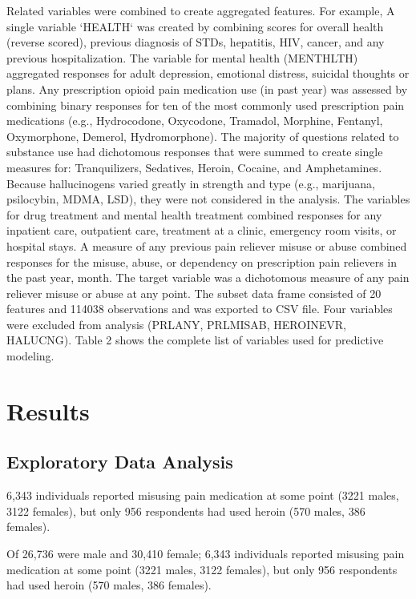 \documentclass[sigconf]{acmart}
\begin{document}
Related variables were combined to create aggregated features. For example, 
A single variable `HEALTH` was created by combining scores for overall health 
(reverse scored), previous diagnosis of STDs, hepatitis, HIV, cancer, and 
any previous hospitalization. The variable for mental health (MENTHLTH) 
aggregated responses for adult depression, emotional distress, suicidal 
thoughts or plans. Any prescription opioid pain medication use (in past year) 
was assessed by combining binary responses for ten of the most commonly used 
prescription pain medications (e.g., Hydrocodone, Oxycodone, Tramadol, 
Morphine, Fentanyl, Oxymorphone, Demerol, Hydromorphone). The majority of 
questions related to substance use had dichotomous responses that were summed 
to create single measures for: Tranquilizers, Sedatives, Heroin, Cocaine, 
and Amphetamines. Because hallucinogens varied greatly in strength and type 
(e.g., marijuana, psilocybin, MDMA, LSD), they were not considered in the 
analysis. The variables for drug treatment and mental health treatment 
combined responses for any inpatient care, outpatient care, treatment at a 
clinic, emergency room visits, or hospital stays. A measure of any previous 
pain reliever misuse or abuse combined responses for the misuse, abuse, or 
dependency on prescription pain relievers in the past year, month. The target 
variable was a dichotomous measure of any pain reliever misuse or abuse at any 
point. The subset data frame consisted of 20 features and 114038 observations 
and was exported to CSV file. Four variables were excluded from analysis 
(PRLANY, PRLMISAB, HEROINEVR, HALUCNG). Table 2 shows the complete list of 
variables used for predictive modeling. 

\section{Results}

\subsection{Exploratory Data Analysis}

6,343 individuals reported misusing pain medication at some point
(3221 males, 3122 females), but only 956 respondents had used heroin (570 males, 
386 females). 

Of  26,736 were male and 30,410 
female; 6,343 individuals reported misusing pain medication at some point
(3221 males, 3122 females), but only 956 respondents had used heroin (570 males, 
386 females). 
\end{document}
